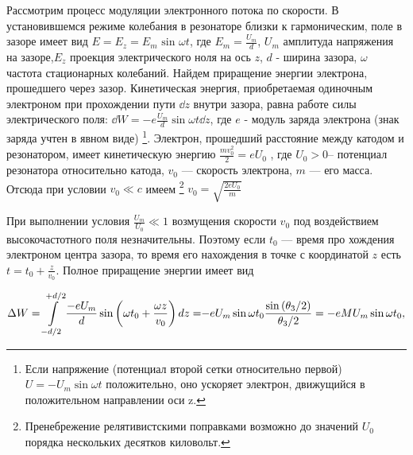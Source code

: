 Рассмотрим процесс модуляции электронного потока по скорости. В установившемся режиме колебания в резонаторе близки к гармоническим, поле в зазоре имеет вид 
$E = E _ { z } = E _ { m } \text { sin } \omega t$, 
где $E _ { m } = \frac { U _ { m } } { d }$, $U _ { m }$ амплитуда напряжения на зазоре,$E _ { z }$ проекция электрического ноля на ось $z$,
$d$ - ширина зазора, $\omega$ частота стационарных колебаний. Найдем приращение энергии электрона, прошедшего через зазор. Кинетическая энергия,
приобретаемая одиночным электроном при прохождении пути $\dd z$ внутри за­зора, равна работе силы электрического поля: 
$\dd W = - e \frac { U _ { m } } { d } \sin \omega t \dd z$, 
где $e$ - модуль заряда электрона (знак заряда учтен в явном виде)
\footnote{Если напряжение (потенциал второй сетки относительно первой) $U = -U_m \sin \omega t$ положительно, оно ускоряет электрон, движущийся в положительном направлении оси z.}. 
Электрон, прошедший расстояние между катодом и резонатором, имеет кинетическую энергию 
$\frac { m v _ { 0 } ^ { 2 } } { 2 } = e U _ { 0 }$ , где $U_0 > 0$-- потенциал резонатора относительно ка­тода, $v_0$ — скорость электрона, $m$ — его масса. Отсюда при условии $v _ { 0 } \ll c$ имеем
\footnote{Пренебрежение релятивистскими поправками возможно до значений $U_0$ порядка нескольких
десятков киловольт.} 
$v _ { 0 } = \sqrt { \frac { 2 e U _ { 0 } } { m } }$

При выполнении условия 
$\frac { U _ { m } } { U _ { 0 } } \ll 1$ возмущения скорости $v_0$ под воздействием высокочастотного поля незначительны. Поэтому если $t_0$ — время про­
хождения электроном центра зазора, то время его нахождения в точке с координатой $z$ есть $t = t _ { 0 } + \frac { z } { v _ { 0 } }$. Полное приращение энергии имеет вид

\begin{equation}
	 { \Delta W = \int\limits _ { - d / 2 }^{{ + d / 2 }} \frac { - e U _ { m } } { d } \sin \left( \omega t _ { 0 } + \frac { \omega z } { v _ { 0 } } \right) d z = } \\ 
	 { - e U _ { m } \sin \omega t _ { 0 } \frac { \sin \left( \theta _ { 3 } / 2 \right) } { \theta_ { 3 } / 2 } = - e M U _ { m } \sin \omega t _ { 0 }, } 
\end{equation}

